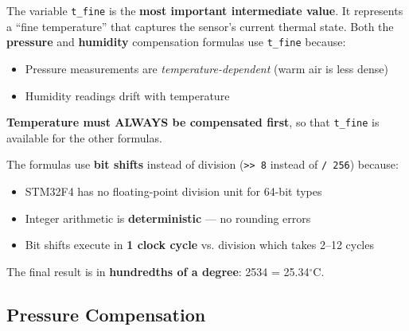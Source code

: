 \documentclass[12pt, a4paper]{article}
\begin{document}
\begin{conceptbox}
The variable \texttt{t\_fine} is the \textbf{most important intermediate value}. It represents a ``fine temperature'' that captures the sensor's current thermal state. Both the \textbf{pressure} and \textbf{humidity} compensation formulas use \texttt{t\_fine} because:

\begin{itemize}[leftmargin=1.5em]
    \item Pressure measurements are \textit{temperature-dependent} (warm air is less dense)
    \item Humidity readings drift with temperature
\end{itemize}

\textbf{Temperature must ALWAYS be compensated first}, so that \texttt{t\_fine} is available for the other formulas.
\end{conceptbox}

\begin{tipbox}
The formulas use \textbf{bit shifts} instead of division (\texttt{>> 8} instead of \texttt{/ 256}) because:
\begin{itemize}[leftmargin=1.5em]
    \item STM32F4 has no floating-point division unit for 64-bit types
    \item Integer arithmetic is \textbf{deterministic} --- no rounding errors
    \item Bit shifts execute in \textbf{1 clock cycle} vs. division which takes 2--12 cycles
\end{itemize}
The final result is in \textbf{hundredths of a degree}: 2534 = 25.34$^\circ$C.
\end{tipbox}

\subsection{Pressure Compensation}
\end{document}
